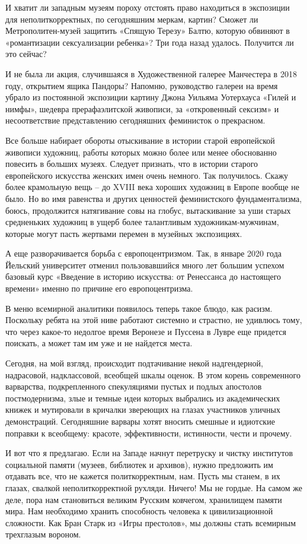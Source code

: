 И хватит ли западным музеям пороху отстоять право находиться в экспозиции для
неполиткорректных, по сегодняшним меркам, картин? Сможет ли Метрополитен-музей
защитить «Спящую Терезу» Балтю, которую обвиняют в «романтизации сексуализации
ребенка»? Три года назад удалось. Получится ли это сейчас?

И не была ли акция, случившаяся в Художественной галерее Манчестера в 2018
году, открытием ящика Пандоры? Напомню, руководство галереи на время убрало из
постоянной экспозиции картину Джона Уильяма Уотерхауса «Гилей и нимфы», шедевра
прерафаэлитской живописи, за «откровенный сексизм» и несоответствие
представлению сегодняшних феминисток о прекрасном.

Все больше набирает обороты отыскивание в истории старой европейской живописи
художниц, работы которых можно более или менее обоснованно повесить в больших
музеях. Следует признать, что в истории старого европейского искусства женских
имен очень немного. Так получилось. Скажу более крамольную вещь – до XVIII века
хороших художниц в Европе вообще не было. Но во имя равенства и других
ценностей феминистского фундаментализма, боюсь, продолжится натягивание совы на
глобус, вытаскивание за уши старых средненьких художниц в ущерб более
талантливым художникам-мужчинам, которые могут пасть жертвами перемен в
музейных экспозициях. 

А еще разворачивается борьба с европоцентризмом. Так, в январе 2020 года
Йельский университет отменил пользовавшийся много лет большим успехом базовый
курс «Введение в историю искусства: от Ренессанса до настоящего времени» именно
по причине его европоцентризма.

В меню всемирной аналитики появилось теперь такое блюдо, как расизм. Поскольку
ребята на этой ниве работают системно и страстно, не удивлюсь тому, что через
какое-то недолгое время Веронезе и Пуссена в Лувре еще придется поискать, а
может там им уже и не найдется места.

Сегодня, на мой взгляд, происходит подтачивание некой надгендерной, надрасовой,
надклассовой, всеобщей шкалы оценок. В этом корень современного варварства,
подкрепленного спекуляциями пустых и подлых апостолов постмодернизма, злые и
темные идеи которых выбрались из академических книжек и мутировали в кричалки
звереющих на глазах участников уличных демонстраций. Сегодняшние варвары хотят
вносить смешные и идиотские поправки к всеобщему: красоте, эффективности,
истинности, чести и прочему.

И вот что я предлагаю. Если на Западе начнут перетруску и чистку институтов
социальной памяти (музеев, библиотек и архивов), нужно предложить им отдавать
все, что не кажется политкорректным, нам. Пусть мы станем, в их глазах, свалкой
неполиткорректной рухляди. Ничего! Мы не гордые. На самом же деле, пора нам
становиться великим Русским ковчегом, хранилищем памяти мира. Нам необходимо
хранить способность человека к цивилизационной сложности. Как Бран Старк из
«Игры престолов», мы должны стать всемирным трехглазым вороном.

